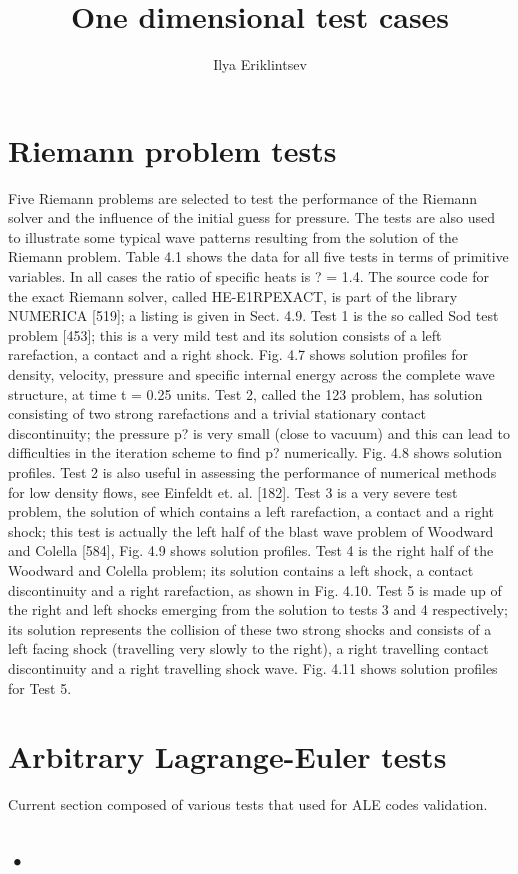 \documentclass[10pt,a4paper]{article}
\author{Ilya Eriklintsev}
\title{One dimensional test cases}
\begin{document}
\section{Riemann problem tests}
Five Riemann problems are selected to test the performance of the Riemann
solver and the influence of the initial guess for pressure. The tests are
also used to illustrate some typical wave patterns resulting from the solution
of the Riemann problem. Table 4.1 shows the data for all five tests in terms
of primitive variables. In all cases the ratio of specific heats is ? = 1.4. The
source code for the exact Riemann solver, called HE-E1RPEXACT, is part of
the library NUMERICA [519]; a listing is given in Sect. 4.9.
Test 1 is the so called Sod test problem [453]; this is a very mild test and
its solution consists of a left rarefaction, a contact and a right shock. Fig.
4.7 shows solution profiles for density, velocity, pressure and specific internal
energy across the complete wave structure, at time t = 0.25 units. Test 2,
called the 123 problem, has solution consisting of two strong rarefactions and
a trivial stationary contact discontinuity; the pressure p? is very small (close
to vacuum) and this can lead to difficulties in the iteration scheme to find p?
numerically. Fig. 4.8 shows solution profiles. Test 2 is also useful in assessing
the performance of numerical methods for low density flows, see Einfeldt et.
al. [182]. Test 3 is a very severe test problem, the solution of which contains a
left rarefaction, a contact and a right shock; this test is actually the left half
of the blast wave problem of Woodward and Colella [584], Fig. 4.9 shows solution
profiles. Test 4 is the right half of the Woodward and Colella problem; its
solution contains a left shock, a contact discontinuity and a right rarefaction,
as shown in Fig. 4.10. Test 5 is made up of the right and left shocks emerging
from the solution to tests 3 and 4 respectively; its solution represents the collision
of these two strong shocks and consists of a left facing shock (travelling
very slowly to the right), a right travelling contact discontinuity and a right
travelling shock wave. Fig. 4.11 shows solution profiles for Test 5.
\section{Arbitrary Lagrange-Euler tests}
Current section composed of various tests that used for ALE codes validation.

\subsection{•}

\medskip
 
\printbibliography
\end{document}
